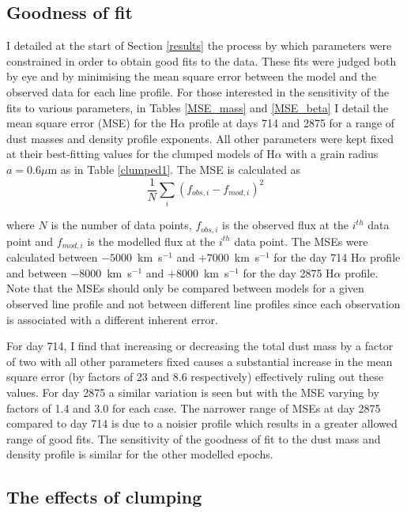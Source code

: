 \subsection{Goodness of fit}
I detailed at the start of Section \ref{results} the process by which parameters were constrained in order to obtain good fits to the data.  These fits were judged both by eye and by minimising the mean square error between the model and the observed data for each line profile.  For those interested in the sensitivity of the fits to various parameters, in Tables \ref{MSE_mass} and \ref{MSE_beta} I detail the mean square error (MSE) for the H$\alpha$ profile at days 714 and 2875 for a range of dust masses and density profile exponents.  All other parameters were kept fixed at their best-fitting values for the clumped models of H$\alpha$ with a grain radius $a=0.6\mu$m as in Table \ref{clumped1}.  The MSE is calculated as
\begin{equation}
\frac{1}{N} \sum_i (f_{obs,i} - f_{mod,i})^2
\end{equation}

where $N$ is the number of data points, $f_{obs,i}$ is the observed flux at the $i^{th}$ data point 
and $f_{mod,i}$ is the modelled flux at the $i^{th}$ data point. The MSEs were calculated between $-5000$~km~s$^{-1}$ and $+7000$~km~s$^{-1}$ for the day 714 H$\alpha$ profile and between $-8000$~km~s$^{-1}$ and $+8000$~km~s$^{-1}$ for the day 2875 H$\alpha$ profile.  Note that the MSEs should only be compared between models for a given observed line profile and not between different line profiles since each observation is associated with a different inherent error.

For day 714, I find that increasing or decreasing the total dust mass by a factor of two with all other parameters fixed causes a substantial increase in the mean square error (by factors of 23 and 8.6 respectively) effectively ruling out these values.  For day 2875 a similar variation is seen but with the MSE varying by factors of 1.4 and 3.0 for each case.  The narrower range of MSEs at day 2875 compared to day 714 is due to a noisier profile which results in a greater allowed range of good fits.   The sensitivity of the goodness of fit to the dust mass and density profile is similar for the other modelled epochs.


\subsection{The effects of clumping}

